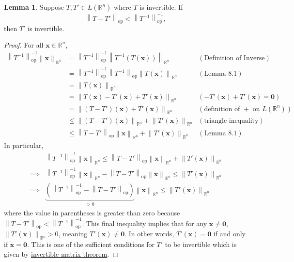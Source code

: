 \documentclass{article}
\newcommand{\R}{\mathbb{R}}
\newcommand{\x}{\mathbf{x}}
\newcommand{\ze}{\mathbf{0}}
\newcommand{\norm}[1]{\left\lVert#1\right\rVert}
\newcommand{\normop}[1]{\left\lVert#1\right\rVert_\text{op}}
\theoremstyle{definition}
\newtheorem{lemma}{Lemma}[section]
\begin{document}
	\begin{lemma}
		Suppose $ T,T'\in L(\R^n) $ where $ T $ is invertible. If $$ \normop{T-T'}<\normop{T^{-1}}^{-1} ,$$ then $ T' $ is invertible.   
	\end{lemma} 
	\begin{proof}
		For all $ \x\in\R^n $,
		\begin{align*}
			\normop{T^{-1}}^{-1}\norm{\x}_{\R^n} & = \normop{T^{-1}}^{-1}\norm{T^{-1}(T(\x))}_{\R^n}  & (\text{Definition of Inverse})\\& = \normop{T^{-1}}^{-1}\normop{T^{-1}}\norm{T(\x)}_{\R^n}  & (\text{Lemma } 8.1)\\ & = \norm{T(\x)}_{\R^n} \\ 
			& = \norm{T(\x) - T'(\x) + T'(\x)}_{\R^n} & (- T'(\x) + T'(\x) = \ze ) \\ 
			& = \norm{(T- T')(\x) + T'(\x)}_{\R^n} & (\text{definition of }+\text{ on }L(\R^n)) \\ 
			& \le \norm{(T- T')(\x)}_{\R^n} + \norm{T'(\x)}_{\R^n} & (\text{triangle inequality})
			\\ 
			& \le \normop{T-T'}\norm{\x}_{\R^n} + \norm{T'(\x)}_{\R^n} & (\text{Lemma }8.1)
		\end{align*}
		In particular, 
		\begin{align*}
			&\normop{T^{-1}}^{-1}\norm{\x}_{\R^n}  \le \normop{T-T'}\norm{\x}_{\R^n} + \norm{T'(\x)}_{\R^n}\\\implies & \normop{T^{-1}}^{-1}\norm{\x}_{\R^n} - \normop{T-T'}\norm{\x}_{\R^n} \le \norm{T'(\x)}_{\R^n}\\ \implies &  \underbrace{\left(\normop{T^{-1}}^{-1} - \normop{T-T'}\right)}_{> 0}\norm{\x}_{\R^n}  \le  \norm{T'(\x)}_{\R^n}
		\end{align*}
		where the value in parentheses is greater than zero because $ \normop{T-T'}<\normop{T^{-1}}^{-1} $. This final inequality implies that for any $ \x\neq \ze $, $ \norm{T'(\x)}_{\R^n} > 0$, meaning $ T'(\x)\neq \ze $. In other words, $ T'(\x)=\ze $ if and only if $ \x =\ze $. This is one of the sufficient conditions for $ T' $ to be invertible which is given by \href{https://mathworld.wolfram.com/InvertibleMatrixTheorem.html}{invertible matrix theorem}. 
	\end{proof}
\end{document}
